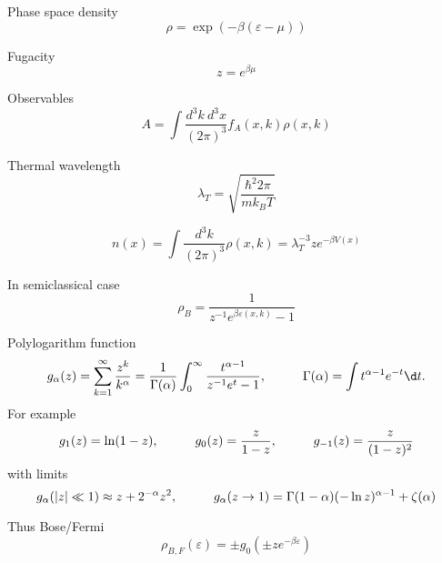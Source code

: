 Phase space density
\begin{equation*}
	\rho = \exp\left( - \beta(\varepsilon-\mu)\right)
\end{equation*}

Fugacity
\begin{equation*}
	z = e^{\beta \mu}
\end{equation*}


Observables
\begin{equation*}
	A = \int \frac{d^3 k \ d^3 x}{(2\pi)^3} f_A(x, k) \rho(x, k)
\end{equation*}

Thermal wavelength
\begin{equation*}
	\lambda_T = \sqrt{\frac{\hbar^2 2\pi}{m k_B T}}
\end{equation*}

\begin{equation*}
	n(x) = \int \frac{d^3 k}{(2\pi)^3} \rho(x, k) = \lambda_T^{-3} z e^{- \beta V(x)}
\end{equation*}




In semiclassical case
\begin{equation*}
	\rho_B = \frac{1}{z^{-1} e^{\beta \varepsilon(x,k)}-1}
\end{equation*}


Polylogarithm function
\begin{equation*}
	g_\alpha(z) = \sum_{k=1}^{\infty} \frac{z^k}{k^\alpha} = \frac{1}{\Gamma(\alpha)} \int_{0}^{\infty} \frac{t^{\alpha-1}}{z^{-1} e^t - 1},
	\hspace{10 mm} 
	\Gamma(\alpha) = \int t^{\alpha-1} e^{-t} \d t.
\end{equation*}
For example
\begin{equation*}
	g_1(z) = \ln (1-z),
	\hspace{10 mm} 
	g_0(z) = \frac{z}{1-z},
	\hspace{10 mm} 
	g_{-1}(z) = \frac{z}{(1-z)^2}
\end{equation*}
with limits
\begin{equation*}
	g_\alpha (|z|\ll 1) \approx z + 2^{-\alpha} z^2,
	\hspace{10 mm} 
	g_\alpha(z \to 1) = \Gamma(1-\alpha) (-\ln z)^{\alpha-1} + \zeta(\alpha)
\end{equation*}

Thus Bose/Fermi
\begin{equation*}
	\rho_{B,F} (\varepsilon) = \pm g_0 (\pm z e^{-\beta \varepsilon})
\end{equation*}


